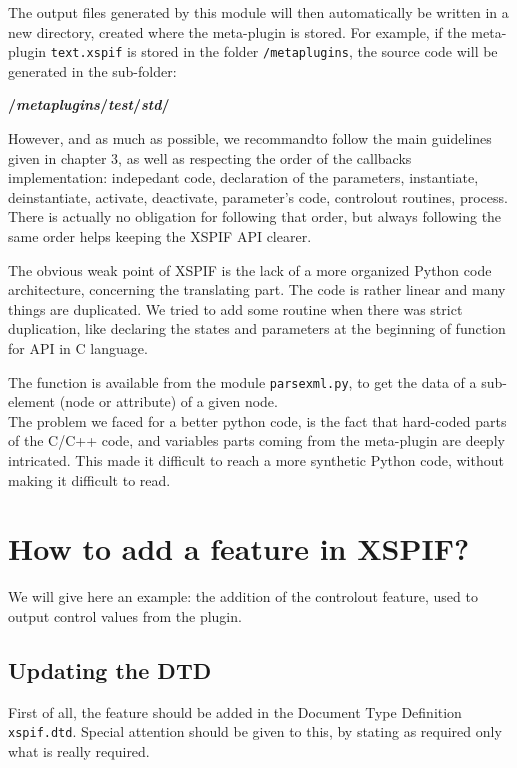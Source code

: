 \noindent The output files generated by this module will then automatically be written in a new directory, created where the meta-plugin is stored. For example, if the meta-plugin \verb|text.xspif| is stored in the folder \verb|/metaplugins|, the source code will be generated in the sub-folder:

\begin{center}
\textbf{/\textit{metaplugins}/\textit{test}/\textit{std}/}
\end{center}

\noindent However, and as much as possible, we recommandto follow the main guidelines given in chapter 3, as well as respecting the order of the callbacks implementation: indepedant code, declaration of the parameters, instantiate, deinstantiate, activate, deactivate, parameter's code, controlout routines, process. There is actually no obligation for following that order, but always following the same order helps keeping the XSPIF API clearer.

\noindent The obvious weak point of XSPIF is the lack of a more organized Python code architecture, concerning the translating part. The code is rather linear and many things are duplicated. We tried to add some routine when there was strict duplication, like declaring the states and parameters at the beginning of function for API in C language.

\noindent The function  is available from the module \verb|parsexml.py|, to get the data of a sub-element (node or attribute) of a given node.\\

\noindent The problem we faced for a better python code, is the fact
that hard-coded parts of the C/C++ code, and variables parts coming
from the meta-plugin are deeply intricated. This made it difficult to
reach a more synthetic Python code, without making it difficult to read.


\section{How to add a feature in XSPIF?}

\noindent We will give here an example: the addition of the controlout feature, used to output control values from the plugin.

\subsection{Updating the DTD}
\noindent First of all, the feature should be added in the Document Type Definition \verb|xspif.dtd|. Special attention should be given to this, by stating as required only what is really required.


